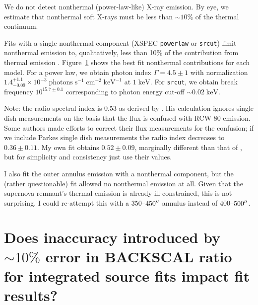 \documentclass[preprint2,tighten,trackchanges]{aastex6}
\newcommand*{\mt}{\mathrm}
\newcommand*{\unit}[1]{\;\mt{#1}}  %
\newcommand*{\abt}{\mathord{\sim}} %
\begin{document}
We do not detect nonthermal (power-law-like) X-ray emission.
By eye, we estimate that nonthermal soft X-rays must be less than $\abt 10\%$
of the thermal continuum.

Fits with a single nonthermal component (XSPEC \texttt{powerlaw} or
\texttt{srcut}) limit nonthermal emission to, qualitatively, less than 10\% of
the contribution from thermal emission \citep[cf.][]{reynolds1999}.
Figure~\ref{fig:nonthermal} shows the best fit nonthermal contributions for
each model.
For a power law, we obtain photon index $\Gamma = 4.5 \pm 1$ with
normalization $1.4^{+1.1}_{-0.09} \times 10^{-3} \unit{photons\;s^{-1}\;cm^{-2}\;keV^{-1}}$
at $1 \unit{keV}$.
For \texttt{srcut}, we obtain break frequency $10^{15.7 \pm 0.1}$
corresponding to photon energy cut-off $\abt 0.02 \unit{keV}$.

Note: the radio spectral index is $0.53$ as derived by \citet{gaensler1998-g309}.
His calculation ignores single dish measurements on the basis that the flux
is confused with RCW 80 emission.  Some authors made efforts to correct their
flux measurements for the confusion; if we include Parkes single dish
measurements the radio index decreases to $0.36 \pm 0.11$.
My own fit obtains $0.52 \pm 0.09$, marginally different than that of
\citet{gaensler1998-g309}, but for simplicity and consistency just use their values.

I also fit the outer annulus emission with a nonthermal component, but the
(rather questionable) fit allowed no nonthermal emission at all.
Given that the supernova remnant's thermal emission is already ill-constrained,
this is not surprising.
I could re-attempt this with a $350$--$450\mbox{$^{\prime\prime}$}$ annulus instead of
$400$--$500\mbox{$^{\prime\prime}$}$.  %

\begin{figure*}[!hb]
    \label{fig:nonthermal}
\end{figure*}


\clearpage
\section{Does inaccuracy introduced by $\abt 10\%$ error in BACKSCAL ratio for
integrated source fits impact fit results?}
\end{document}
